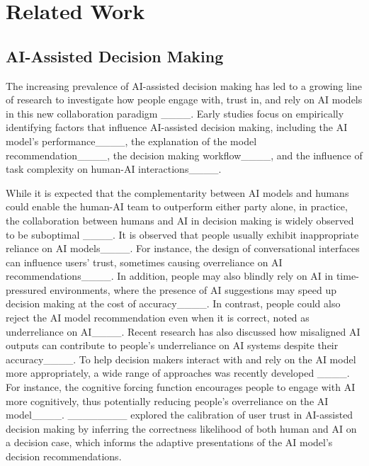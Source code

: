 \section{Related Work}
\label{sec:related}

\subsection{AI-Assisted Decision Making}
The increasing prevalence of AI-assisted decision making has led to a growing line of research to investigate how people engage with, trust in, and rely on AI models in this new collaboration paradigm ____. Early studies focus on empirically identifying factors that influence AI-assisted decision making, including the AI model's performance____, the explanation of the model recommendation____,  the decision making workflow____, and the influence of task complexity on human-AI interactions____.

While it is expected that the complementarity between AI models and humans could enable the human-AI team to outperform either party alone, in practice, the collaboration between humans and AI in decision making is widely observed to be suboptimal ____. It is observed that people usually exhibit inappropriate reliance on AI models____. For instance, the design of conversational interfaces can influence users' trust, sometimes causing overreliance on AI recommendations____. In addition, people may also blindly rely on AI in time-pressured environments, where the presence of AI suggestions may speed up decision making at the cost of accuracy____. In contrast, people could also reject the AI model recommendation even when it is correct, noted as underreliance on AI____. Recent research has also discussed how misaligned AI outputs can contribute to people's underreliance on AI systems despite their accuracy____. To help decision makers interact with and rely on the AI model more appropriately, a wide range of approaches was recently developed ____. For instance, the cognitive forcing function encourages people to engage with AI more cognitively, thus potentially reducing people's overreliance on the AI model____. ________ explored the calibration of user trust in AI-assisted decision making by inferring the correctness likelihood of both human and AI on a decision case, which informs the adaptive presentations of the AI model's decision recommendations. 

